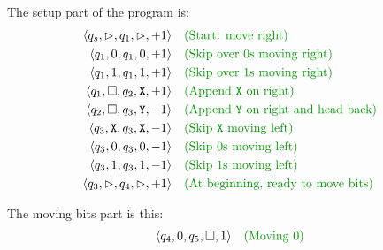 \documentclass[12pt]{extarticle}
\begin{document}
The setup part of the program is:
\begin{align*}
\langle q_s, \vartriangleright, q_1, \vartriangleright, +1 \rangle &&& \expl{Start: move right}\\
\langle q_1, 0, q_1, 0, +1 \rangle &&& \expl{Skip over 0s moving right}\\
\langle q_1, 1, q_1, 1, +1 \rangle &&& \expl{Skip over 1s moving right}\\
\langle q_1, \square, q_2, \texttt{X}, +1\rangle &&& \expl{Append \texttt{X} on right} \\
\langle q_2, \square, q_3, \texttt{Y}, -1 \rangle &&& \expl{Append \texttt{Y} on right and head back}\\
\langle q_3, \texttt{X}, q_3, \texttt{X}, -1 \rangle &&& \expl{Skip \texttt{X} moving left}\\
\langle q_3, 0, q_3, 0, -1 \rangle &&& \expl{Skip 0s moving left}\\
\langle q_3, 1, q_3, 1, -1 \rangle &&& \expl{Skip 1s moving left}\\
\langle q_3, \vartriangleright, q_4, \vartriangleright, +1 \rangle &&& \expl{At beginning, ready to move bits}\\
\end{align*}

The moving bits part is this:
\begin{align*}
\langle q_4, 0, q_5, \square, 1 \rangle &&& \expl{Moving 0}\\
\end{align*}


\end{document}
